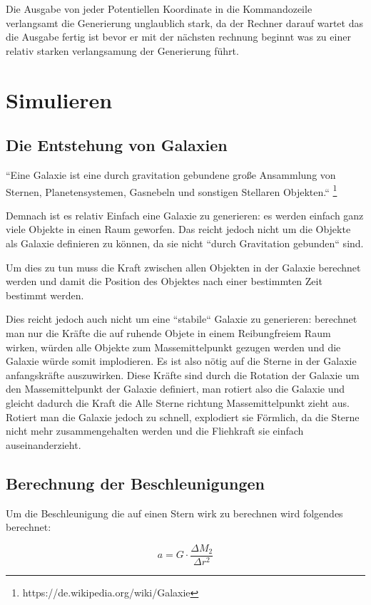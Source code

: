 \documentclass[a4paper, 10pt]{article}
\begin{document}
\begin{multicols*}{2}
Die Ausgabe von jeder Potentiellen Koordinate in die Kommandozeile verlangsamt
die Generierung unglaublich stark, da der Rechner darauf wartet das die Ausgabe
fertig ist bevor er mit der nächsten rechnung beginnt was zu einer relativ
starken verlangsamung der Generierung führt.

\section{Simulieren}

\subsection{Die Entstehung von Galaxien}
``Eine Galaxie ist eine durch gravitation gebundene große Ansammlung von
Sternen, Planetensystemen, Gasnebeln und sonstigen Stellaren Objekten.``
\footnote{ https://de.wikipedia.org/wiki/Galaxie}

Demnach ist es relativ Einfach eine Galaxie zu generieren: es werden einfach
ganz viele Objekte in einen Raum geworfen. Das reicht jedoch nicht um die
Objekte als Galaxie definieren zu können, da sie nicht ``durch Gravitation
gebunden`` sind.

Um dies zu tun muss die Kraft zwischen allen Objekten in der Galaxie berechnet
werden und damit die Position des Objektes nach einer bestimmten Zeit bestimmt
werden.

Dies reicht jedoch auch nicht um eine ``stabile`` Galaxie zu generieren:
berechnet man nur die Kräfte die auf ruhende Objete in einem Reibungfreiem Raum
wirken, würden alle Objekte zum Massemittelpunkt gezugen werden und die Galaxie
würde somit implodieren. Es ist also nötig auf die Sterne in der Galaxie
anfangskräfte auszuwirken.  Diese Kräfte sind durch die Rotation der Galaxie um
den Massemittelpunkt der Galaxie definiert, man rotiert also die Galaxie und
gleicht dadurch die Kraft die Alle Sterne richtung Massemittelpunkt zieht aus.
Rotiert man die Galaxie jedoch zu schnell, explodiert sie Förmlich, da die
Sterne nicht mehr zusammengehalten werden und die Fliehkraft sie einfach
auseinanderzieht.

\subsection{Berechnung der Beschleunigungen}
Um die Beschleunigung die auf einen Stern wirk zu berechnen wird folgendes
berechnet:

\begin{equation} \label{eq:beschleunigung}
    a = G \cdot \frac{\Delta{M_2}}{\Delta{r}^2}
\end{equation}


\end{multicols*}
\end{document}
